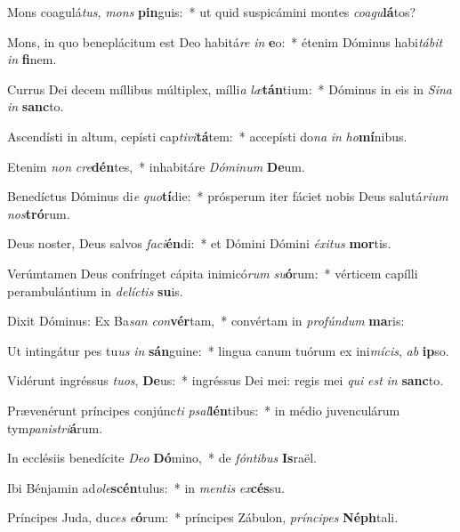 \item Mons coagulá\textit{tus}, \textit{mons} \textbf{pin}guis:~* ut quid suspicámini montes \textit{co}\textit{a}\textit{gu}\textbf{lá}tos?
\item Mons, in quo beneplácitum est Deo habitá\textit{re} \textit{in} \textbf{e}o:~* étenim Dóminus habi\textit{tá}\textit{bit} \textit{in} \textbf{fi}nem.
\item Currus Dei decem míllibus múltiplex, mílli\textit{a} \textit{læ}\textbf{tán}tium:~* Dóminus in eis in \textit{Si}\textit{na} \textit{in} \textbf{sanc}to.
\item Ascendísti in altum, cepísti cap\textit{ti}\textit{vi}\textbf{tá}tem:~* accepísti do\textit{na} \textit{in} \textit{ho}\textbf{mí}nibus.
\item Etenim \textit{non} \textit{cre}\textbf{dén}tes,~* inhabitáre \textit{Dó}\textit{mi}\textit{num} \textbf{De}um.
\item Benedíctus Dóminus di\textit{e} \textit{quo}\textbf{tí}die:~* prósperum iter fáciet nobis Deus salutá\textit{ri}\textit{um} \textit{nos}\textbf{tró}rum.
\item Deus noster, Deus salvos \textit{fa}\textit{ci}\textbf{én}di:~* et Dómini Dómini \textit{éx}\textit{i}\textit{tus} \textbf{mor}tis.
\item Verúmtamen Deus confrínget cápita inimicó\textit{rum} \textit{su}\textbf{ó}rum:~* vérticem capílli perambulántium in \textit{de}\textit{líc}\textit{tis} \textbf{su}is.
\item Dixit Dóminus: Ex Ba\textit{san} \textit{con}\textbf{vér}tam,~* convértam in \textit{pro}\textit{fún}\textit{dum} \textbf{ma}ris:
\item Ut intingátur pes tu\textit{us} \textit{in} \textbf{sán}guine:~* lingua canum tuórum ex ini\textit{mí}\textit{cis}, \textit{ab} \textbf{ip}so.
\item Vidérunt ingréssus \textit{tu}\textit{os}, \textbf{De}us:~* ingréssus Dei mei: regis mei \textit{qui} \textit{est} \textit{in} \textbf{sanc}to.
\item Prævenérunt príncipes conjúnc\textit{ti} \textit{psal}\textbf{lén}tibus:~* in médio juvenculárum tym\textit{pa}\textit{nis}\textit{tri}\textbf{á}rum.
\item In ecclésiis benedícite \textit{De}\textit{o} \textbf{Dó}mino,~* de \textit{fón}\textit{ti}\textit{bus} \textbf{Is}raël.
\item Ibi Bénjamin ad\textit{o}\textit{le}\textbf{scén}tulus:~* in \textit{men}\textit{tis} \textit{ex}\textbf{cés}su.
\item Príncipes Juda, du\textit{ces} \textit{e}\textbf{ó}rum:~* príncipes Zábulon, \textit{prín}\textit{ci}\textit{pes} \textbf{Néph}tali.
